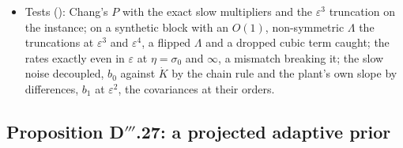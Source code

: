 \begin{itemize}
    the predicted range of the fast jitter $(\varepsilon/2)\tr(H\hat J(t)^\T\hat J(t))$: the formula holds as the
    period average.
  \item Tests (): Chang's $P$ with the exact slow multipliers and the
    $\varepsilon^3$ truncation on the instance; on a synthetic block with an $O(1)$, non-symmetric $\Lambda$ the
    truncations at $\varepsilon^3$ and $\varepsilon^4$, a flipped $\Lambda$ and a dropped cubic term caught; the rates
    exactly even in $\varepsilon$ at $\eta=\sigma_0$ and $\infty$, a mismatch breaking it; the slow noise decoupled,
    $b_0$ against $\dot K$ by the chain rule and the plant's own slope by differences, $b_1$ at $\varepsilon^2$, the
    covariances at their orders.
\end{itemize}

\subsection{Proposition D\texorpdfstring{$'''$}{'''}.27: a projected adaptive prior}

